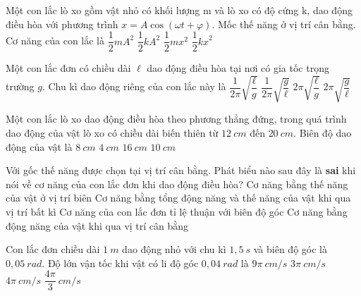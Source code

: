 	\begin{ex} %
		Một con lắc lò xo gồm vật nhỏ có khối lượng m và lò xo có độ cứng k, dao động điều hòa với phương trình $x=A\cos \left({\omega t+\varphi }\right)$. Mốc thế năng ở vị trí cân bằng. Cơ năng của con lắc là
		\choice
		{$\dfrac{1}{2}{mA}^2$}
		{\True $\dfrac{1}{2}{kA}^2$}
		{$\dfrac{1}{2}{mx}^2$}
		{$\dfrac{1}{2}{kx}^2$}
	\end{ex}
	\begin{ex} %
		Một con lắc đơn có chiều dài $\ell$ dao động điều hòa tại nơi có gia tốc trọng trường $g$. Chu kì dao động riêng của con lắc này là
		\choice
		{$\dfrac{1}{2\pi}\sqrt{\dfrac{\ell}{g}}$}
		{$\dfrac{1}{2\pi}\sqrt{\dfrac{g}{\ell}}$}
		{\True $2\pi \sqrt{\dfrac{\ell}{g}}$}
		{$2\pi \sqrt{\dfrac{g}{\ell}}$}
	\end{ex}
	\begin{ex}%
		Một con lắc lò xo dao động điều hòa theo phương thẳng đứng, trong quá trình dao động của vật lò xo có chiều dài biến thiên từ $12\ cm$ đến $20\ cm$. Biên độ dao động của vật là
		\choice
		{$8\ cm$}
		{\True $4\ cm$}
		{$16\ cm$}
		{$10\ cm$}
	\end{ex}
	\begin{ex} %
		Với gốc thế năng được chọn tại vị trí cân bằng. Phát biểu nào sau đây là \textbf{sai} khi nói về cơ năng của con lắc đơn khi dao động điều hòa?
		\choice
		{Cơ năng bằng thế năng của vật ở vị trí biên}
		{Cơ năng bằng tổng động năng và thế năng của vật khi qua vị trí bất kì}
		{\True Cơ năng của con lắc đơn tỉ lệ thuận với biên độ góc}
		{Cơ năng bằng động năng của vật khi qua vị trí cân bằng}
	\end{ex}
	\begin{ex}%
		Con lắc đơn chiều dài $1\ m$ dao động nhỏ với chu kì $1,5\ s$ và biên độ góc là $0,05\ rad$. Độ lớn vận tốc khi vật có li độ góc $0,04\ rad$ là
		\choice
		{$9\pi \ cm/s$}
		{$3\pi \ cm/s$}
		{\True $4\pi \ cm/s$}
		{$\dfrac{4\pi}{3}\ cm/s$}
	\end{ex}

